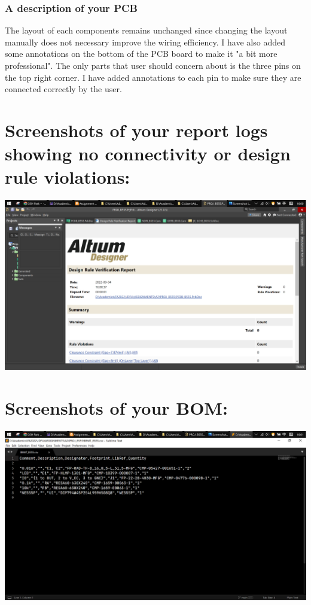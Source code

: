 \documentclass{article}
\begin{document}
	\subsubsection{A description of your PCB}
	The layout of each components remains unchanged since changing the layout manually does not necessary improve the wiring efficiency. I have also added some annotations on the bottom of the PCB board to make it "a bit more professional". The only parts that user should concern about is the three pins on the top right corner. I have added annotations to each pin to make sure they are connected correctly by the user.
	\section{Screenshots of your report logs showing no connectivity or design rule violations:}
	\includegraphics[width=\columnwidth]{DRVA_B555}
	\section{Screenshots of your BOM:}
	\includegraphics[width=\columnwidth]{BMAT_B555}
\end{document}
